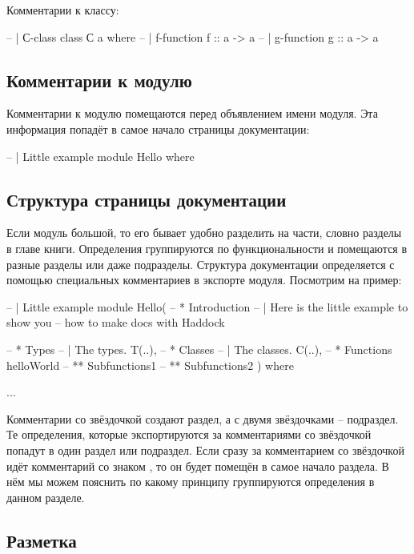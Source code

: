 Комментарии к классу:

\begin{code}
-- | С-class
class С a where
    -- | f-function
    f :: a -> a
    -- | g-function
    g :: a -> a
\end{code}

\subsection{Комментарии к модулю}

Комментарии к модулю помещаются перед объявлением имени
модуля. Эта информация попадёт в самое начало страницы документации:


\begin{code}
-- | Little example
module Hello where
\end{code}

\subsection{Структура страницы документации}

Если модуль большой, то его бывает удобно разделить 
на части, словно разделы в главе книги. Определения 
группируются по функциональности и помещаются в разные разделы
или даже подразделы.
Структура документации определяется с помощью специальных
комментариев в экспорте модуля. Посмотрим на пример:



\begin{code}
-- | Little example
module Hello(
    -- * Introduction
    -- | Here is the little example to show you
    -- how to make docs with Haddock
    
    -- * Types
    -- | The types.
    T(..),
    -- * Classes
    -- | The classes.
    C(..),
    -- * Functions
    helloWorld
    -- ** Subfunctions1
    -- ** Subfunctions2    
) where

...
\end{code}

Комментарии со звёздочкой создают раздел, а с двумя 
звёздочками -- подраздел. Те определения, которые 
экспортируются за комментариями со звёздочкой попадут в 
один раздел или подраздел. Если сразу за комментарием со 
звёздочкой идёт комментарий со знаком , то
он будет помещён в самое начало раздела. В нём мы можем 
пояснить по какому принципу группируются определения
в данном разделе.

\subsection{Разметка}

